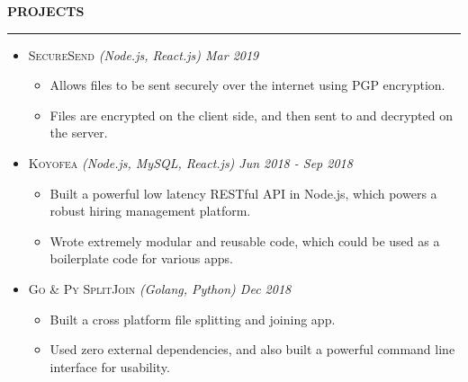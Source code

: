 \documentclass[a4paper, 12pt]{article}
\begin{document}
\Large{\textbf{PROJECTS}}\vspace{-0.5cm}\newline
\rule{19cm}{0.01cm}
\vspace{-0.4cm}
\begin{itemize}
\item{\large{\textsc{SecureSend} \textit{(Node.js, React.js)\hspace{9.4cm} \normalsize{Mar 2019}}}}\vspace{-1.3cm}\newline
	\begin{itemize}
		\item{\small{Allows files to be sent securely over the internet using PGP encryption.}}\vspace{-0.4cm}
		\item{\small{Files are encrypted on the client side, and then sent to and decrypted on the server.}}
	\end{itemize}
\vspace{-0.4cm}
\item{\large{\textsc{Koyofea} \textit{(Node.js, MySQL, React.js)\hspace{6.2cm} \normalsize{Jun 2018 - Sep 2018}}}}\vspace{-1.3cm}\newline
	\begin{itemize}
		\item{\small{Built a powerful low latency RESTful API in Node.js, which powers a robust hiring management platform.}}\vspace{-0.4cm}
		\item{\small{Wrote extremely modular and reusable code, which could be used as a boilerplate code for various apps.}}
	\end{itemize}
\vspace{-0.4cm}
\item{\large{\textsc{Go \& Py SplitJoin} \textit{(Golang, Python)\hspace{7.9cm} \normalsize{Dec 2018}}}}\vspace{-1.3cm}\newline
	\begin{itemize}
		\item{\small{Built a cross platform file splitting and joining app.}}\vspace{-0.4cm}
		\item{\small{Used zero external dependencies, and also built a powerful command line interface for usability.}}


\end{itemize}
\end{itemize}
\end{document}
